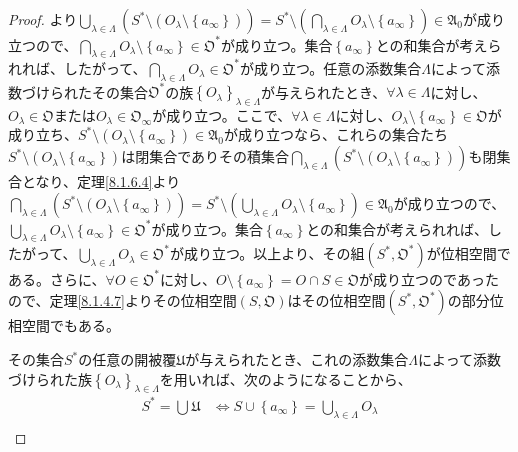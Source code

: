\documentclass[dvipdfmx]{jsarticle}
\begin{document}
\begin{proof}
より$\bigcup_{\lambda \in \varLambda } \left( S^{*} \setminus \left( O_{\lambda} \setminus \left\{ a_{\infty} \right\} \right) \right) = S^{*} \setminus \left( \bigcap_{\lambda \in \varLambda } O_{\lambda} \setminus \left\{ a_{\infty} \right\} \right) \in \mathfrak{A}_{0}$が成り立つので、$\bigcap_{\lambda \in \varLambda } O_{\lambda} \setminus \left\{ a_{\infty} \right\} \in \mathfrak{O}^{*}$が成り立つ。集合$\left\{ a_{\infty} \right\}$との和集合が考えられれば、したがって、$\bigcap_{\lambda \in \varLambda } O_{\lambda} \in \mathfrak{O}^{*}$が成り立つ。任意の添数集合$\varLambda$によって添数づけられたその集合$\mathfrak{O}^{*}$の族$\left\{ O_{\lambda} \right\}_{\lambda \in \varLambda }$が与えられたとき、$\forall\lambda \in \varLambda$に対し、$O_{\lambda}\in \mathfrak{O}$または$O_{\lambda} \in \mathfrak{O}_{\infty}$が成り立つ。ここで、$\forall\lambda \in \varLambda$に対し、$O_{\lambda} \setminus \left\{ a_{\infty} \right\}\in \mathfrak{O}$が成り立ち、$S^{*} \setminus \left( O_{\lambda} \setminus \left\{ a_{\infty} \right\} \right) \in \mathfrak{A}_{0}$が成り立つなら、これらの集合たち$S^{*} \setminus \left( O_{\lambda} \setminus \left\{ a_{\infty} \right\} \right)$は閉集合でありその積集合$\bigcap_{\lambda \in \varLambda } \left( S^{*} \setminus \left( O_{\lambda} \setminus \left\{ a_{\infty} \right\} \right) \right)$も閉集合となり、定理\ref{8.1.6.4}より$\bigcap_{\lambda \in \varLambda } \left( S^{*} \setminus \left( O_{\lambda} \setminus \left\{ a_{\infty} \right\} \right) \right) = S^{*} \setminus \left( \bigcup_{\lambda \in \varLambda } O_{\lambda} \setminus \left\{ a_{\infty} \right\} \right) \in \mathfrak{A}_{0}$が成り立つので、$\bigcup_{\lambda \in \varLambda } O_{\lambda} \setminus \left\{ a_{\infty} \right\} \in \mathfrak{O}^{*}$が成り立つ。集合$\left\{ a_{\infty} \right\}$との和集合が考えられれば、したがって、$\bigcup_{\lambda \in \varLambda } O_{\lambda} \in \mathfrak{O}^{*}$が成り立つ。以上より、その組$\left( S^{*},\mathfrak{O}^{*} \right)$が位相空間である。さらに、$\forall O \in \mathfrak{O}^{*}$に対し、$O \setminus \left\{ a_{\infty} \right\} = O \cap S \in \mathfrak{O}$が成り立つのであったので、定理\ref{8.1.4.7}よりその位相空間$\left( S,\mathfrak{O} \right)$はその位相空間$\left( S^{*},\mathfrak{O}^{*} \right)$の部分位相空間でもある。\par
その集合$S^{*}$の任意の開被覆$\mathfrak{U}$が与えられたとき、これの添数集合$\varLambda$によって添数づけられた族$\left\{ O_{\lambda} \right\}_{\lambda \in \varLambda}$を用いれば、次のようになることから、
\begin{align*}
S^{*} = \bigcup_{} \mathfrak{U} &\Leftrightarrow S \cup \left\{ a_{\infty} \right\} = \bigcup_{\lambda \in \varLambda} O_{\lambda}\\

\end{align*}
\end{proof}
\end{document}
